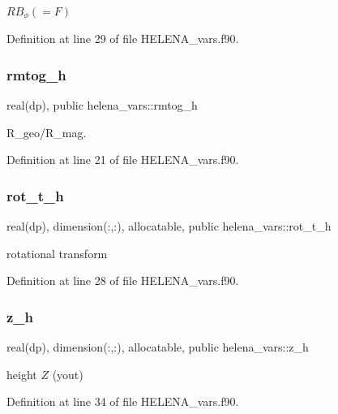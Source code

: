 $R B_\phi (= F) $ 



Definition at line 29 of file H\+E\+L\+E\+N\+A\+\_\+vars.\+f90.

\mbox{\label{namespacehelena__vars_ae7f70e6b0e2babde94c88cd5141a215e}} 
\subsubsection{\texorpdfstring{rmtog\+\_\+h}{rmtog\_h}}
{\footnotesize\ttfamily real(dp), public helena\+\_\+vars\+::rmtog\+\_\+h}



R\+\_\+geo/\+R\+\_\+mag. 



Definition at line 21 of file H\+E\+L\+E\+N\+A\+\_\+vars.\+f90.

\mbox{\label{namespacehelena__vars_ae54b26f364e5cc4da39bbb01807e0da1}} 
\subsubsection{\texorpdfstring{rot\+\_\+t\+\_\+h}{rot\_t\_h}}
{\footnotesize\ttfamily real(dp), dimension(\+:,\+:), allocatable, public helena\+\_\+vars\+::rot\+\_\+t\+\_\+h}



rotational transform 



Definition at line 28 of file H\+E\+L\+E\+N\+A\+\_\+vars.\+f90.

\mbox{\label{namespacehelena__vars_a41e897edb2a8b34fa7bde28ff57d012a}} 
\subsubsection{\texorpdfstring{z\+\_\+h}{z\_h}}
{\footnotesize\ttfamily real(dp), dimension(\+:,\+:), allocatable, public helena\+\_\+vars\+::z\+\_\+h}



height $Z$ (yout) 



Definition at line 34 of file H\+E\+L\+E\+N\+A\+\_\+vars.\+f90.

